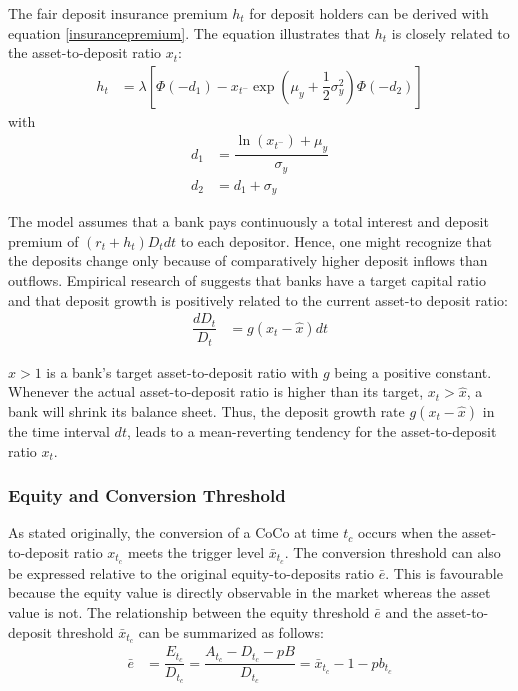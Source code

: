 The fair deposit insurance premium $h_t$ for deposit holders can be derived with equation \ref{insurancepremium}. The equation illustrates that $h_t$ is closely related to the asset-to-deposit ratio $x_t$:
\begin{align} \label{insurancepremium}
 h_t &=  \lambda \left[ \Phi\left( -d_1 \right) - x_{t^{-}} \exp\left( \mu_y + \dfrac{1}{2} \sigma_y^2 \right) \Phi\left( -d_2 \right)    \right]
\end{align}
with
\begin{align}
d_1 &= \dfrac{\ln\left( x_{t^{-}}\right) + \mu_y}{\sigma_y}\\
d_2 &= d_1 + \sigma_y
\end{align}

The model assumes that a bank pays continuously a total interest and deposit premium of $\left( r_t + h_t \right) D_t dt$ to each depositor. Hence, one might recognize that the deposits change only because of comparatively higher deposit inflows than outflows. Empirical research of \citet{adrian2010liquidity} suggests that banks have a target capital ratio and that deposit growth is positively related to the current asset-to deposit ratio:
\begin{align}\label{depositgrowthprocess}
\dfrac{dD_t}{D_t} &= g\left(x_t -\hat{x} \right)dt
\end{align}

$\hat{x} > 1$ is a bank's target asset-to-deposit ratio with $g$ being a positive constant. Whenever the actual asset-to-deposit ratio is higher than its target, $x_t > \hat{x}$, a bank will shrink its balance sheet. Thus, the deposit growth rate $g\left( x_t - \hat{x} \right)$ in the time interval $dt$, leads to a mean-reverting tendency for the asset-to-deposit ratio $x_t$.

\subsubsection*{Equity and Conversion Threshold}

As stated originally, the conversion of a CoCo at time $t_c$ occurs when the asset-to-deposit ratio $x_{t_c}$ meets the trigger level $\bar{x}_{t_c}$. The conversion threshold can also be expressed relative to the original equity-to-deposits ratio $\bar{e}$. This is favourable because the equity value is directly observable in the market whereas the asset value is not. The relationship between the equity threshold $\bar{e}$ and the asset-to-deposit threshold $\bar{x}_{t_c}$ can be summarized as follows:
\begin{align}
\bar{e} &= \dfrac{E_{t_c}}{D_{t_c}} = \dfrac{A_{t_c} - D_{t_c} - pB}{D_{t_c}} = \bar{x}_{t_c} - 1 - p b_{t_c}
\end{align}


